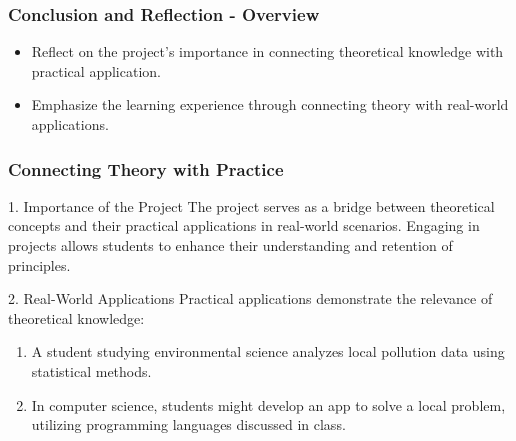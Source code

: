 \documentclass[aspectratio=169]{beamer}
\begin{document}
\begin{frame}[fragile]
    \frametitle{Conclusion and Reflection - Overview}
    \begin{itemize}
        \item Reflect on the project's importance in connecting theoretical knowledge with practical application.
        \item Emphasize the learning experience through connecting theory with real-world applications.
    \end{itemize}
\end{frame}

\begin{frame}[fragile]
    \frametitle{Connecting Theory with Practice}
    \begin{block}{1. Importance of the Project}
        The project serves as a bridge between theoretical concepts and their practical applications in real-world scenarios. Engaging in projects allows students to enhance their understanding and retention of principles.
    \end{block}
    
    \begin{block}{2. Real-World Applications}
        Practical applications demonstrate the relevance of theoretical knowledge:
        \begin{enumerate}
            \item A student studying environmental science analyzes local pollution data using statistical methods.
            \item In computer science, students might develop an app to solve a local problem, utilizing programming languages discussed in class.
        \end{enumerate}
    \end{block}
\end{frame}
\end{document}
